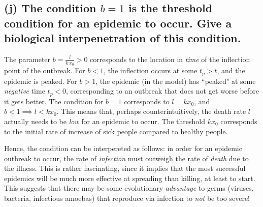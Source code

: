 \documentclass[draft]{agujournal2019}
\begin{document}
\subsection{(j) The condition $b=1$ is the threshold condition for an epidemic to occur. Give a biological interpenetration of this condition. }
\label{ssec:p2j}
The parameter $b=\frac{l}{k\,x_0}>0$ corresponds to the location in \emph{time} of the inflection point of the outbreak. For $b<1$, the inflection occurs at some $t_p>t$, and the epidemic is peaked. For $b>1$, the epidemic (in the model) has ``peaked" at some \emph{negative} time $t_p<0$, corresponding to an outbreak that does not get worse before it gets better. The condition for $b=1$ corresponds to $l = k x_0$, and $b<1\implies l < k x_0$. This means that, perhaps counterintuitively, the death rate $l$ actually needs to be \emph{low} for an epidemic to occur. The threshold $kx_0$ corresponds to the initial rate of increase of sick people compared to healthy people. 
\par
Hence, the condition can be interpereted as follows: in order for an epidemic outbreak to occur, the rate of \emph{infection} must outweigh the rate of \emph{death} due to the illness. This is rather fascinating, since it implies that the most successful epidemics will be much more effective at spreading than killing, at least to start. This suggests that there may be some evolutionary \emph{advantage} to germs (viruses, bacteria, infectious amoebas) that reproduce via infection to \emph{not} be too severe!
\end{document}
